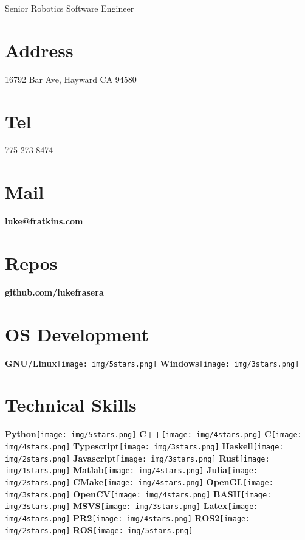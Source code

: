 \documentclass[]{friggeri-cv}
\begin{document}
      {Senior Robotics Software Engineer}
      

\begin{aside}
  \section{Address}
    16792 Bar Ave, Hayward CA 94580
    ~
  \section{Tel}
    775-273-8474
    ~
  \section{Mail}
    \textbf{luke@fratkins.com}
    ~
  \section{Repos}
    \textbf{github.com/lukefrasera}
    ~
  \section{OS Development}
    \textbf{GNU/Linux}\texttt{[image: img/5stars.png]}
    \textbf{Windows}\texttt{[image: img/3stars.png]}
    ~
  \section{Technical Skills}
  \textbf{Python}\texttt{[image: img/5stars.png]}
    \textbf{C++}\texttt{[image: img/4stars.png]}
    \textbf{C}\texttt{[image: img/4stars.png]}
    \textbf{Typescript}\texttt{[image: img/3stars.png]}
    \textbf{Haskell}\texttt{[image: img/2stars.png]}
    \textbf{Javascript}\texttt{[image: img/3stars.png]}
    \textbf{Rust}\texttt{[image: img/1stars.png]}
    \textbf{Matlab}\texttt{[image: img/4stars.png]}
    \textbf{Julia}\texttt{[image: img/2stars.png]}
    \textbf{CMake}\texttt{[image: img/4stars.png]}
    \textbf{OpenGL}\texttt{[image: img/3stars.png]}
    \textbf{OpenCV}\texttt{[image: img/4stars.png]}
    \textbf{BASH}\texttt{[image: img/3stars.png]}
    \textbf{MSVS}\texttt{[image: img/3stars.png]}
    \textbf{Latex}\texttt{[image: img/4stars.png]}
    \textbf{PR2}\texttt{[image: img/4stars.png]}
    \textbf{ROS2}\texttt{[image: img/2stars.png]}
    \textbf{ROS}\texttt{[image: img/5stars.png]}
    ~
\end{aside}
\end{document}
